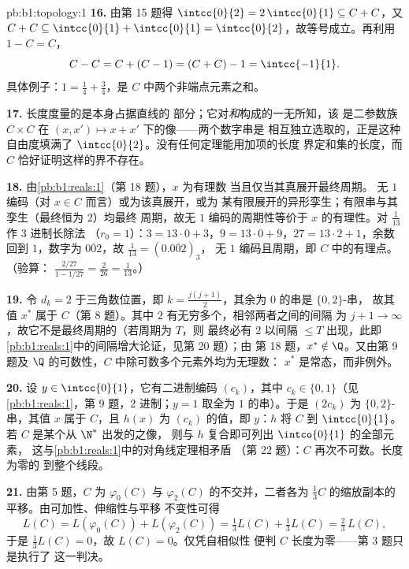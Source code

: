 \begin{solution}{pb:b1:topology:1}
\textbf{16.} 由第 15 题得 $\intcc{0}{2} = 2\,\intcc{0}{1}
\subseteq C + C$，又 $C + C \subseteq \intcc{0}{1} +
\intcc{0}{1} = \intcc{0}{2}$，故等号成立。再利用 $1 - C = C$，
\[
C - C = C + (C - 1) = (C + C) - 1 = \intcc{-1}{1} .
\]
具体例子：$1 = \frac14 + \frac34$，是
$C$ 中两个非端点元素之和。

\textbf{17.} 长度度量的是本身占据直线的
部分；它对\emph{和}构成的一无所知，该
是二参数族 $C \times C$ 在 $(x,
x') \mapsto x + x'$ 下的像——两个数字串是
相互独立选取的，正是这种自由度填满了
$\intcc{0}{2}$。没有任何定理能用加项的长度
界定和集的长度，而 $C$ 恰好证明这样的界不存在。

\textbf{18.} 由\cref{pb:b1:reals:1}（第 18 题），$x$ 为有理数
当且仅当其真展开最终周期。
无 $1$ 编码（对 $x \in C$ 而言）或为该真展开，或为
某有限展开的异形孪生；有限串与其
孪生（最终恒为 $2$）均最终
周期，故无 $1$ 编码的周期性等价于
$x$ 的有理性。对 $\frac1{13}$ 作 $3$ 进制长除法
（$r_0 = 1$）：$3 = 13\cdot0 + 3$，$9 = 13\cdot0 + 9$，$27 =
13\cdot2 + 1$，余数回到 $1$，数字为
$\overline{002}$，故 $\frac1{13} = (0.\overline{002})_3$，
无 $1$ 编码且周期，即 $C$ 中的有理点。（验算：
$\frac{2/27}{1 - 1/27} = \frac{2}{26} = \frac1{13}$。）

\textbf{19.} 令 $d_k = 2$ 于三角数位置，即
$k = \frac{j(j+1)}{2}$，其余为 $0$ 的串是 $\{0,2\}$-串，
故其值 $x^*$ 属于 $C$（第
8 题）。其中 $2$ 有无穷多个，相邻两者之间的间隔
为 $j + 1 \to \infty$，故它不是最终周期的（若周期为 $T$，则
最终必有 $2$ 以间隔 $\leq T$ 出现，此即
\cref{pb:b1:reals:1}中的间隔增大论证，见第 20 题）；由
第 18 题，$x^* \notin \Q$。又由第 9 题及
$\Q$ 的可数性，$C$ 中除可数多个元素外均为无理数：
$x^*$ 是常态，而非例外。

\textbf{20.} 设 $y \in \intcc{0}{1}$，它有二进制编码
$(c_k)$，其中 $c_k \in \{0, 1\}$（见\cref{pb:b1:reals:1}，第
9 题，$2$ 进制；$y = 1$ 取全为 $1$ 的串）。于是 $(2c_k)$
为 $\{0,2\}$-串，其值 $x$ 属于 $C$，且 $h(x)$ 为
$(c_k)$ 的值，即 $y$：$h$ 将 $C$ 到
$\intcc{0}{1}$。若 $C$ 是某个从 $\N^*$ 出发的之像，
则与 $h$ 复合即可列出 $\intco{0}{1}$ 的全部元素，
这与\cref{pb:b1:reals:1}中的对角线定理相矛盾
（第 22 题）：$C$ 再次不可数。长度为零的
到整个线段。

\textbf{21.} 由第 5 题，$C$ 为
$\varphi_0(C)$ 与 $\varphi_2(C)$ 的不交并，二者各为
$\frac13 C$ 的缩放副本的平移。由可加性、伸缩性与平移
不变性可得
\[
L(C) = L(\varphi_0(C)) + L(\varphi_2(C))
= \tfrac13 L(C) + \tfrac13 L(C) = \tfrac23\,L(C),
\]
于是 $\frac13 L(C) = 0$，故 $L(C) = 0$。仅凭自相似性
便判 $C$ 长度为零——第 3 题只是执行了
这一判决。


\end{solution}
